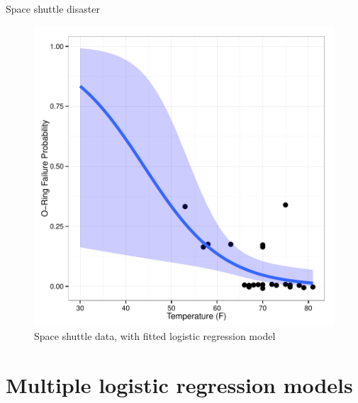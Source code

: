 \documentclass[11pt]{book}\usepackage[]{graphicx}\usepackage[]{color}
\begin{document}
\begin{Example}{Space shuttle disaster}
\begin{figure}
\centering
\includegraphics[width=.7\textwidth]{ch07/fig/nasa-temp-ggplot}
\caption{Space shuttle data, with fitted logistic regression model}
\label{fig:nasa-temp-ggplot}
\end{figure}

\end{Example}



\section{Multiple logistic regression models}\label{sec:logist-mult}
\end{document}
